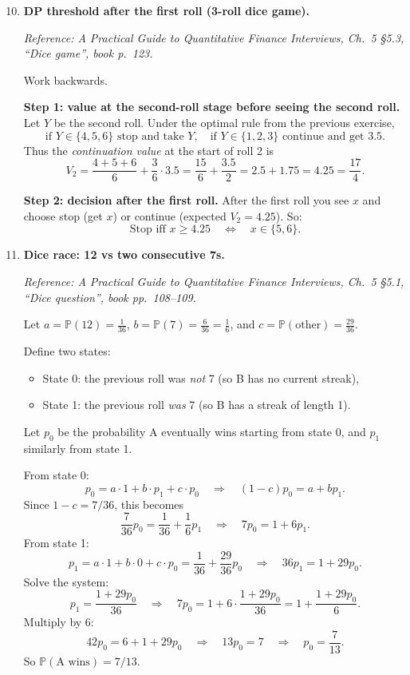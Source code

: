 \documentclass[11pt]{article}
\begin{document}
\begin{enumerate}[leftmargin=*, itemsep=1.0em]
\setcounter{enumi}{9}

\item \textbf{DP threshold after the first roll (3-roll dice game).}

\textit{Reference: A Practical Guide to Quantitative Finance Interviews, Ch.\ 5 \S5.3, ``Dice game'', book p.\ 123.}

\medskip
Work backwards.

\textbf{Step 1: value at the second-roll stage before seeing the second roll.}
Let $Y$ be the second roll. Under the optimal rule from the previous exercise,
\[
\text{if }Y\in\{4,5,6\}\text{ stop and take }Y,\quad
\text{if }Y\in\{1,2,3\}\text{ continue and get }3.5.
\]
Thus the \emph{continuation value} at the start of roll 2 is
\[
V_2=\frac{4+5+6}{6}+\frac{3}{6}\cdot 3.5=\frac{15}{6}+\frac{3.5}{2}=2.5+1.75=4.25=\frac{17}{4}.
\]

\textbf{Step 2: decision after the first roll.}
After the first roll you see $x$ and choose stop (get $x$) or continue (expected $V_2=4.25$).
So:
\[
\text{Stop iff }x\ge 4.25\quad\Longleftrightarrow\quad x\in\{5,6\}.
\]

\item \textbf{Dice race: 12 vs two consecutive 7s.}

\textit{Reference: A Practical Guide to Quantitative Finance Interviews, Ch.\ 5 \S5.1, ``Dice question'', book pp.\ 108--109.}

\medskip
Let $a=\mathbb{P}(12)=\frac{1}{36}$, $b=\mathbb{P}(7)=\frac{6}{36}=\frac{1}{6}$, and $c=\mathbb{P}(\text{other})=\frac{29}{36}$.

Define two states:
\begin{itemize}
\item State 0: the previous roll was \emph{not} 7 (so B has no current streak),
\item State 1: the previous roll \emph{was} 7 (so B has a streak of length 1).
\end{itemize}
Let $p_0$ be the probability A eventually wins starting from state 0, and $p_1$ similarly from state 1.

From state 0:
\[
p_0=a\cdot 1+b\cdot p_1+c\cdot p_0
\quad\Rightarrow\quad
(1-c)p_0=a+bp_1.
\]
Since $1-c=7/36$, this becomes
\[
\frac{7}{36}p_0=\frac{1}{36}+\frac{1}{6}p_1
\quad\Longrightarrow\quad
7p_0=1+6p_1.
\]
From state 1:
\[
p_1=a\cdot 1+b\cdot 0+c\cdot p_0
=\frac{1}{36}+\frac{29}{36}p_0
\quad\Longrightarrow\quad
36p_1=1+29p_0.
\]
Solve the system:
\[
p_1=\frac{1+29p_0}{36}
\quad\Rightarrow\quad
7p_0=1+6\cdot\frac{1+29p_0}{36}
=1+\frac{1+29p_0}{6}.
\]
Multiply by 6:
\[
42p_0=6+1+29p_0
\quad\Rightarrow\quad
13p_0=7
\quad\Rightarrow\quad
p_0=\frac{7}{13}.
\]
So $\boxed{\mathbb{P}(\text{A wins})=7/13}$.


\end{enumerate}
\end{document}
